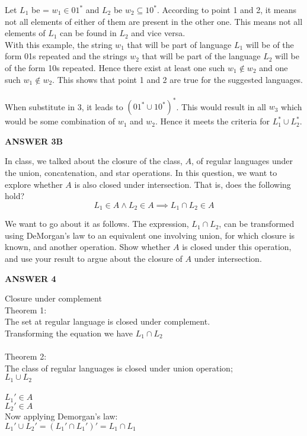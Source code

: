\documentclass[addpoints]{exam}
\begin{document}
\begin{questions}
  Let $L_{1}$ be = ${w_{1} \in {01}^*}$ and $L_{2}$ be ${w_{2} \subseteq {10}^*}$. According to point 1 and 2, it means not all elements of either of them are present in the other one. This means not all elements of $L_{1}$ can be found in $L_{2}$ and vice versa. \\
  
  With this example, the string $w_{1}$ that will be part of language $L_{1}$ will be of the form 01s repeated and the strings $w_{2}$ that will be part of the language $L_{2}$ will be of the form 10s repeated. Hence there exist at least one such $w_{1} \not\in w_{2}$ and one such $w_{1} \not\in  w_{2}$. This shows that point 1 and 2 are true for the suggested languages.
  \\ \\
  When substitute in 3, it leads to $({01}^* \cup {10}^*)^*$. This would result in all $w_{3}$ which would be some combination of $w_{1}$ and $w_{2}$. Hence it meets the criteria for $L_{1}^* \cup L_{2}^*$.

  \begin{center}
      \textbf{ANSWER 3B}
  \end{center}

  

  

\question[5] In class, we talked about the closure of the class, $A$, of regular languages under the union, concatenation, and star operations. In this question, we want to explore whether $A$ is also closed under intersection. That is, does the following hold?
  \[
    L_1\in A \land L_2\in A \implies L_1 \cap L_2\in A
  \]

  We want to go about it as follows. The expression, $L_1 \cap L_2$, can be transformed using DeMorgan's law to an equivalent one involving union, for which closure is known, and another operation. Show whether $A$ is closed under this operation, and use your result to argue about the closure of $A$ under intersection.
   \begin{center}
      \textbf{ANSWER 4 }
  \end{center} 
  Closure under complement \\ 
  Theorem 1:\\
  The set at regular language is closed under complement. \\
  Transforming the equation we have $L_{1} \cap L_{2}$ \\ \\
     Theorem 2: \\
     The class of regular languages is closed under union operation; \\
     $L_{1} \cup L_{2}$ \\ \\
     $L_{1}' \in A$\\
     $L_{2}' \in A$ \\
    Now applying Demorgan's law: \\
    $L_{1}' \cup L_{2}' = (L_{1}' \cap L_{1}')' = L_{1} \cap L_{1} $
  \\


\end{questions}
\end{document}
